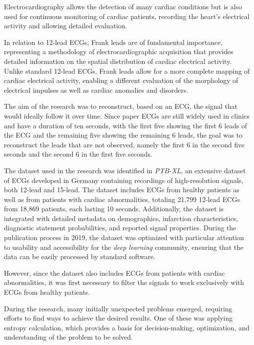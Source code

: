 \documentclass[12pt,italian]{report}
\begin{document}
Electrocardiography allows the detection of many cardiac conditions but is also used for continuous monitoring of cardiac patients, recording the heart's electrical activity and allowing detailed evaluation.

In relation to 12-lead ECGs, Frank leads are of fundamental importance, representing a methodology of electrocardiographic acquisition that provides detailed information on the spatial distribution of cardiac electrical activity. Unlike standard 12-lead ECGs, Frank leads allow for a more complete mapping of cardiac electrical activity, enabling a different evaluation of the morphology of electrical impulses as well as cardiac anomalies and disorders.

The aim of the research was to reconstruct, based on an ECG, the signal that would ideally follow it over time. Since paper ECGs are still widely used in clinics and have a duration of ten seconds, with the first five showing the first 6 leads of the ECG and the remaining five showing the remaining 6 leads, the goal was to reconstruct the leads that are not observed, namely the first 6 in the second five seconds and the second 6 in the first five seconds.

The dataset used in the research was identified in \textit{PTB-XL}, an extensive dataset of ECGs developed in Germany containing recordings of high-resolution signals, both 12-lead and 15-lead. The dataset includes ECGs from healthy patients as well as from patients with cardiac abnormalities, totaling 21,799 12-lead ECGs from 18,869 patients, each lasting 10 seconds. Additionally, the dataset is integrated with detailed metadata on demographics, infarction characteristics, diagnostic statement probabilities, and reported signal properties. During the publication process in 2019, the dataset was optimized with particular attention to usability and accessibility for the \textit{deep learning} community, ensuring that the data can be easily processed by standard software.

However, since the dataset also includes ECGs from patients with cardiac abnormalities, it was first necessary to filter the signals to work exclusively with ECGs from healthy patients.

During the research, many initially unexpected problems emerged, requiring efforts to find ways to achieve the desired results. One of these was applying entropy calculation, which provides a basis for decision-making, optimization, and understanding of the problem to be solved.
\end{document}

